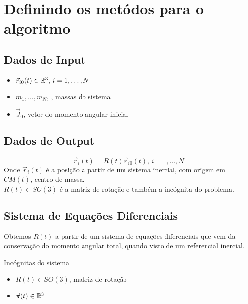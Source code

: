 %
\chapter{Definindo os metódos para o algoritmo}
\label{sec:metodos}
\section{Dados de Input}

\begin{itemize}
    \item \( \vec{r}_{i0}(t) \in \mathbb{R}^3, \, i = 1, \dots, N \)
    \item \(m_1, \dots, m_N, \, \), massas do sistema
    \item \(\vec{J}_0\), vetor do momento angular inicial
\end{itemize}

\section{Dados de Output}
\[\vec{r}_i(t) = R(t)\vec{r}_{i0}(t), \,  i = 1, \dots, N\]
Onde \(\vec{r}_i(t) \) é a posição a partir de um sistema inercial, com origem em \(CM(t)\), centro de massa.\\
\(R(t) \in SO(3)\) é a matriz de rotação e também a incógnita do problema. 

\section{Sistema de Equações Diferenciais}
Obtemos \(R(t)\) a partir de um sistema de equações diferenciais que vem da conservação do momento angular total, quando visto de um referencial inercial.\\

\begin{Large}
Incógnitas do sistema
\end{Large}
\begin{itemize}
\item \(R(t) \in SO(3)\), matriz de rotação
\item \(\vec{\pi}(t) \in \mathbb{R}^3\)
\end{itemize}

